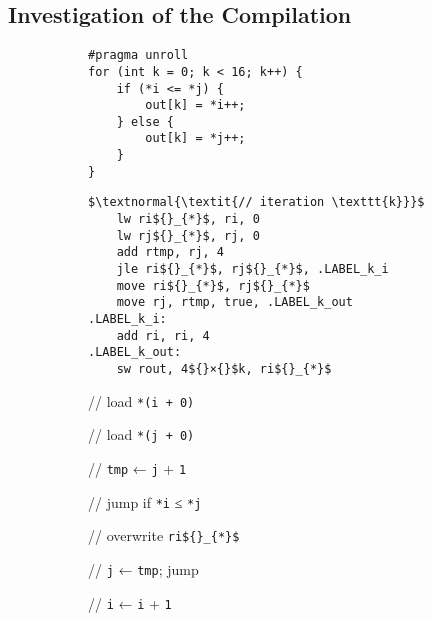 \subsection{Investigation of the Compilation}
\label{sec:tasklet:merge:compilation}

\begin{figure}[p]
	\lstset{basicstyle=\ttfamily\small}
	\def\codewidth{0.34\linewidth}
	\newlength\assemblerwidth \setlength{}
	\begin{subfigure}{\textwidth}
		\begin{minipage}{\codewidth}
			\begin{lstlisting}[belowskip=3\baselineskip+\medskipamount]
#pragma unroll
for (int k = 0; k < 16; k++) {
	if (*i <= *j) {
		out[k] = *i++;
	} else {
		out[k] = *j++;
	}
}
			\end{lstlisting}
		\end{minipage}
		\hfill
		\begin{minipage}{\assemblerwidth}
			\begin{minipage}{ \widthof{\lstinline|	move rj, rtmp, true, .LABEL_k_out|} }
				\begin{lstlisting}[language={[DPU]Assembler}, mathescape, keepspaces]
$\textnormal{\textit{// iteration \texttt{k}}}$
	lw ri${}_{*}$, ri, 0
	lw rj${}_{*}$, rj, 0
	add rtmp, rj, 4
	jle ri${}_{*}$, rj${}_{*}$, .LABEL_k_i
	move ri${}_{*}$, rj${}_{*}$
	move rj, rtmp, true, .LABEL_k_out
.LABEL_k_i:
	add ri, ri, 4
.LABEL_k_out:
	sw rout, 4${}×{}$k, ri${}_{*}$
\end{lstlisting}
			\end{minipage}
			\hfill
			\begin{minipage}{ \widthof{\itshape// jump if \lstinline|*i| ≤ \lstinline|*j|} }
				\itshape\small
				\phantom{lg}

				// load \lstinline|*(i + 0)|

				// load \lstinline|*(j + 0)|

				// \lstinline|tmp| ← \lstinline|j| + \lstinline|1|

				// jump if \lstinline|*i| ≤ \lstinline|*j|

				// overwrite \lstinline[mathescape]|ri${}_{*}$|

				// \lstinline|j| ← \lstinline|tmp|; jump

				\phantom{lg}

				// \lstinline|i| ← \lstinline|i| + \lstinline|1|

				\phantom{lg}


\end{minipage}
\end{minipage}
\end{subfigure}
\end{figure}
